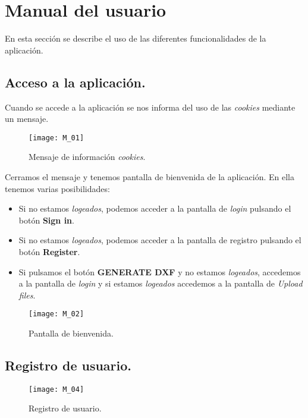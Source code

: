 \section{Manual del usuario}

En esta sección se describe el uso de las diferentes funcionalidades de la aplicación.
\subsection{Acceso a la aplicación.}
Cuando se accede a la aplicación se nos informa del uso de las \emph{cookies} mediante un mensaje. 

\begin{figure}[H]
	\centering
	\texttt{[image: M\_01]}
	\caption{Mensaje de información \emph{cookies}.}
	\label{fig:M_01}
\end{figure}

Cerramos el mensaje y tenemos pantalla de bienvenida de la aplicación. En ella tenemos varias posibilidades:

\begin{itemize}
\item Si no estamos \emph{logeados}, podemos acceder a la pantalla de  \emph{login} pulsando el botón \textbf{Sign in}.
\item Si no estamos \emph{logeados}, podemos acceder a la pantalla de  registro pulsando el botón \textbf{Register}.
\item Si pulsamos el botón \textbf{GENERATE DXF} y no estamos \emph{logeados}, accedemos a la pantalla de \emph{login} y si estamos   \emph{logeados} accedemos a la pantalla de \emph{Upload files}.

\end{itemize}

\begin{figure}
	\centering
	\texttt{[image: M\_02]}
	\caption{Pantalla de bienvenida.}
	\label{fig:M_02}
\end{figure}

\newpage

\subsection{Registro de usuario.}



\begin{figure}[H]
	\centering
	\texttt{[image: M\_04]}
	\caption{Registro de usuario.}
	\label{fig:M_04}
\end{figure}

